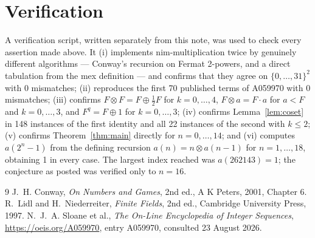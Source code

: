 \documentclass[11pt,a4paper]{article}
\theoremstyle{plain}
\theoremstyle{definition}
\begin{document}
\section{Verification}

A verification script, written separately from this note, was used to check every assertion
made above. It (i) implements nim-multiplication twice by genuinely different algorithms
--- Conway's recursion on Fermat 2-powers, and a direct tabulation from the mex definition
--- and confirms that they agree on $\{0,\dots,31\}^{2}$ with 0 mismatches; (ii) reproduces
the first 70 published terms of A059970 with 0 mismatches; (iii) confirms
$F\otimes F=F\oplus\tfrac12F$ for $k=0,\dots,4$, $F\otimes a=F\cdot a$ for $a<F$ and
$k=0,\dots,3$, and $F^{q}=F\oplus1$ for $k=0,\dots,3$; (iv) confirms
Lemma~\ref{lem:coset} in 148 instances of the first identity and all 22 instances of the
second with $k\le2$; (v) confirms Theorem~\ref{thm:main} directly for $n=0,\dots,14$; and
(vi) computes $a(2^{n}-1)$ from the defining recursion $a(n)=n\otimes a(n-1)$ for
$n=1,\dots,18$, obtaining 1 in every case. The largest index reached was $a(262143)=1$; the
conjecture as posted was verified only to $n=16$.

\begin{thebibliography}{9}
 J.~H. Conway, \emph{On Numbers and Games}, 2nd ed., A K Peters, 2001,
Chapter 6.
 R.~Lidl and H.~Niederreiter, \emph{Finite Fields}, 2nd ed., Cambridge
University Press, 1997.
 N.~J.~A. Sloane et al., \emph{The On-Line Encyclopedia of Integer
Sequences}, \url{https://oeis.org/A059970}, entry A059970, consulted 23 August 2026.
\end{thebibliography}
\end{document}
